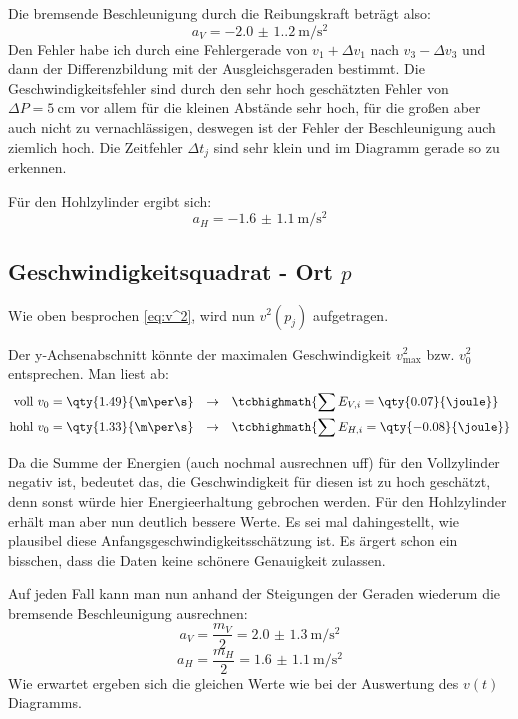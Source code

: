 Die bremsende Beschleunigung durch die Reibungskraft beträgt also:
\[a_V=\qty{-2.0(1.2)}{\m\per\s\squared}\] 
Den Fehler habe ich durch eine Fehlergerade von \(v_1+\Delta v_1\) nach \(v_3-\Delta v_3\) und dann der Differenzbildung mit der Ausgleichsgeraden bestimmt. Die Geschwindigkeitsfehler sind durch den sehr hoch geschätzten Fehler von \(\Delta P=\qty{5}{\cm}\) vor allem für die kleinen Abstände sehr hoch, für die großen aber auch nicht zu vernachlässigen, deswegen ist der Fehler der Beschleunigung auch ziemlich hoch. Die Zeitfehler \(\Delta t_j\) sind sehr klein und im Diagramm gerade so zu erkennen.

Für den Hohlzylinder ergibt sich:
\[a_H=\qty{-1.6(11)}{\m\per\s\squared}\]

\subsection{Geschwindigkeitsquadrat - Ort \(p\)}
Wie oben besprochen \cref{eq:v^2}, wird nun \(v^2(p_j)\) aufgetragen.

Der y-Achsenabschnitt könnte der maximalen Geschwindigkeit \(v^2_{\text{max}}\) bzw. \(v_0^2\) entsprechen. Man liest ab:
\begin{align}
    \text{voll }v_0&=\qty{1.49}{\m\per\s} &\rightarrow && &\tcbhighmath{\sum E_{V,i}=\qty{0.07}{\joule}}\\
    \text{hohl }v_0&=\qty{1.33}{\m\per\s} &\rightarrow && &\tcbhighmath{\sum E_{H,i}=\qty{-0.08}{\joule}}
\end{align}

Da die Summe der Energien (auch nochmal ausrechnen uff) für den Vollzylinder negativ ist, bedeutet das, die Geschwindigkeit für diesen ist zu hoch geschätzt, denn sonst würde hier Energieerhaltung gebrochen werden. Für den Hohlzylinder erhält man aber nun deutlich bessere Werte. Es sei mal dahingestellt, wie plausibel diese Anfangsgeschwindigkeitsschätzung ist. Es ärgert schon ein bisschen, dass die Daten keine schönere Genauigkeit zulassen.

Auf jeden Fall kann man nun anhand der Steigungen der Geraden wiederum die bremsende Beschleunigung ausrechnen:
\[a_V=\frac{m_V}{2}=\qty{2.0(13)}{\m\per\s\squared}\]
\[a_H=\frac{m_H}{2}=\qty{1.6(11)}{\m\per\s\squared}\]
Wie erwartet ergeben sich die gleichen Werte wie bei der Auswertung des \(v(t)\) Diagramms.

